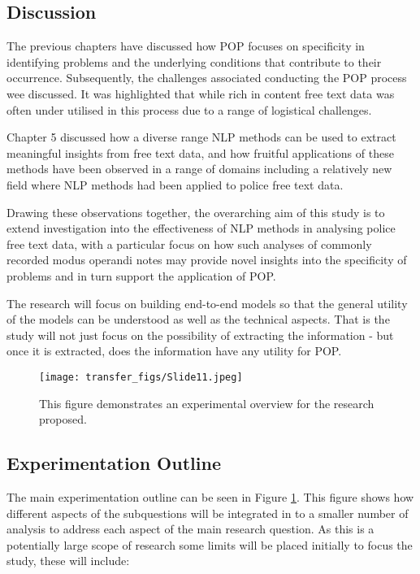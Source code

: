 \subsection{Discussion} 

The previous chapters have discussed how POP focuses on specificity in identifying problems and the underlying conditions that contribute to their occurrence. Subsequently, the challenges associated conducting the POP process wee discussed. It was highlighted that while rich in content free text data was often under utilised in this process due to a range of logistical challenges. 

Chapter 5 discussed how a diverse range NLP methods can be used to extract meaningful insights from free text data, and how fruitful applications of these methods have been observed in a range of domains including a relatively new field where NLP methods had been applied to police free text data.

Drawing these observations together, the overarching aim of this study is to extend investigation into the effectiveness of NLP methods in analysing police free text data, with a particular focus on how such analyses of commonly recorded modus operandi notes may provide novel insights into the specificity of problems and in turn support the application of  POP. 

The research will focus on building end-to-end models so that the general utility of the models can be understood as well as the technical aspects. That is the study will not just focus on the possibility of extracting the information - but once it is extracted, does the information have any utility for POP.


\begin{figure}
  \texttt{[image: transfer\_figs/Slide11.jpeg]}
  \caption[Research Experimental Overview.]{This figure demonstrates an experimental overview for the research proposed.}
  \label{fig:experiment}
\end{figure}

\subsection{Experimentation Outline} The main experimentation outline can be seen in Figure \ref{fig:experiment}. This figure shows how different aspects of the subquestions will be integrated in to a smaller number of analysis to address each aspect of the main research question. As this is a potentially large scope of research some limits will be placed initially to focus the study, these will include:

